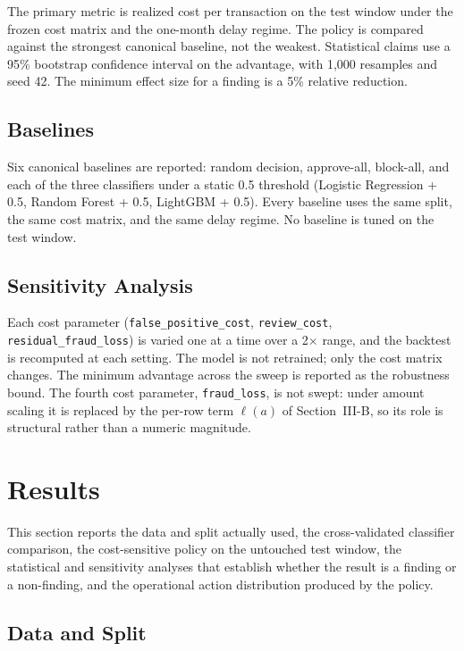 \documentclass[conference]{IEEEtran}
\begin{document}
The primary metric is realized cost per transaction on the test window
under the frozen cost matrix and the one-month delay regime. The policy is
compared against the strongest canonical baseline, not the weakest.
Statistical claims use a 95\% bootstrap confidence interval on the
advantage, with 1,000 resamples and seed 42. The minimum effect size for a
finding is a 5\% relative reduction.

\subsection{Baselines}

Six canonical baselines are reported: random decision, approve-all,
block-all, and each of the three classifiers under a static 0.5 threshold
(Logistic Regression + 0.5, Random Forest + 0.5, LightGBM + 0.5). Every
baseline uses the same split, the same cost matrix, and the same delay
regime. No baseline is tuned on the test window.

\subsection{Sensitivity Analysis}

Each cost parameter (\texttt{false\_positive\_cost}, \texttt{review\_cost},
\texttt{residual\_fraud\_loss}) is varied one at a time over a 2$\times$
range, and the backtest is recomputed at each setting. The model is not
retrained; only the cost matrix changes. The minimum advantage across the
sweep is reported as the robustness bound. The fourth cost parameter,
\texttt{fraud\_loss}, is not swept: under amount scaling it is replaced by
the per-row term $\ell(a)$ of Section~III-B, so its role is structural
rather than a numeric magnitude.

\section{Results}

This section reports the data and split actually used, the cross-validated
classifier comparison, the cost-sensitive policy on the untouched test
window, the statistical and sensitivity analyses that establish whether the
result is a finding or a non-finding, and the operational action
distribution produced by the policy.

\subsection{Data and Split}
\end{document}
